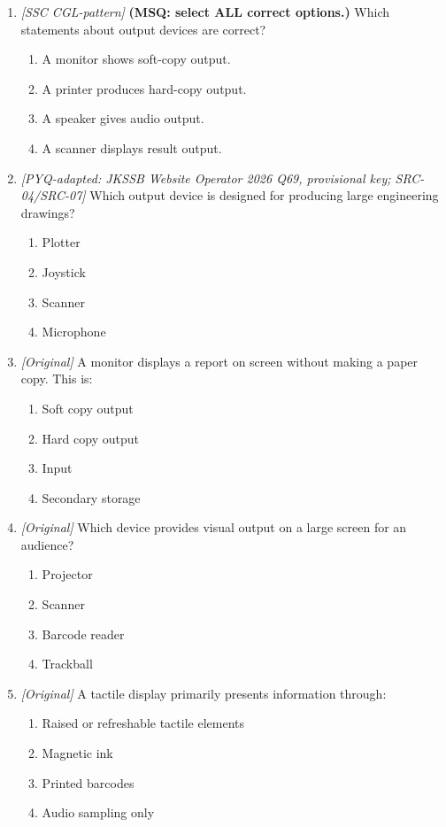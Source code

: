 \begin{enumerate}[label=\textbf{Q\arabic*.}, leftmargin=*]
\begin{enumerate}[label=\Alph*.]
    \item Speaker
    \item Keyboard
  \end{enumerate}
\item \textit{[SSC CGL-pattern]} \textbf{(MSQ: select ALL correct options.)} Which statements about output devices are correct?
  \begin{enumerate}[label=\Alph*.]
    \item A monitor shows soft-copy output.
    \item A printer produces hard-copy output.
    \item A speaker gives audio output.
    \item A scanner displays result output.
  \end{enumerate}
\item \textit{[PYQ-adapted: JKSSB Website Operator 2026 Q69, provisional key; SRC-04/SRC-07]} Which output device is designed for producing large engineering drawings?
  \begin{enumerate}[label=\Alph*.]
\item Plotter
   \item Joystick
   \item Scanner
   \item Microphone
  \end{enumerate}

\item \textit{[Original]} A monitor displays a report on screen without making a paper copy. This is:
  \begin{enumerate}[label=\Alph*.]
\item Soft copy output
   \item Hard copy output
   \item Input
   \item Secondary storage
  \end{enumerate}

\item \textit{[Original]} Which device provides visual output on a large screen for an audience?
  \begin{enumerate}[label=\Alph*.]
\item Projector
   \item Scanner
   \item Barcode reader
   \item Trackball
  \end{enumerate}

\item \textit{[Original]} A tactile display primarily presents information through:
  \begin{enumerate}[label=\Alph*.]
\item Raised or refreshable tactile elements
   \item Magnetic ink
   \item Printed barcodes
   \item Audio sampling only
  \end{enumerate}


\end{enumerate}
